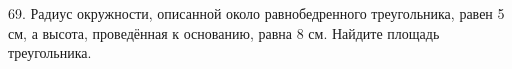 69. Радиус окружности, описанной около равнобедренного треугольника, равен 5 см, а высота, проведённая к основанию, равна 8 см. Найдите площадь треугольника.\\
